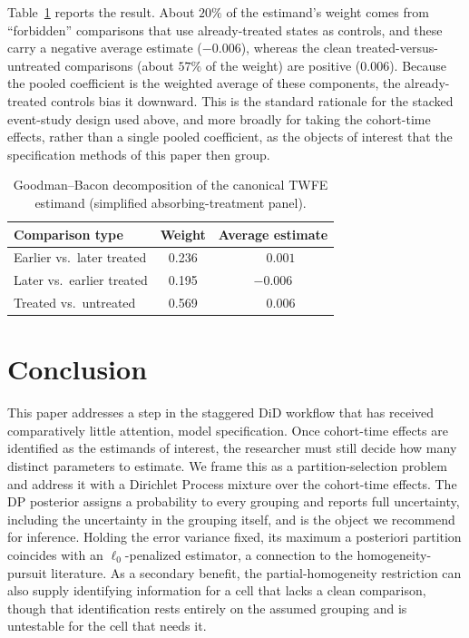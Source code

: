 \documentclass[margin=5in, 12pt]{article}
\newcommand{\1}{\mathbbm{1}}
\begin{document}
Table~\ref{tab:bacon_decomp} reports the result. About $20\%$ of the estimand's weight comes from ``forbidden'' comparisons that use already-treated states as controls, and these carry a negative average estimate ($-0.006$), whereas the clean treated-versus-untreated comparisons (about $57\%$ of the weight) are positive ($0.006$). Because the pooled coefficient is the weighted average of these components, the already-treated controls bias it downward. This is the standard rationale for the stacked event-study design used above, and more broadly for taking the cohort-time effects, rather than a single pooled coefficient, as the objects of interest that the specification methods of this paper then group.

\begin{table}[H]
    \centering
    \caption{Goodman--Bacon decomposition of the canonical TWFE estimand (simplified absorbing-treatment panel).}
    \label{tab:bacon_decomp}
    \begin{tabular}{lcc}
        \toprule
        Comparison type & Weight & Average estimate \\
        \midrule
        Earlier vs.\ later treated & 0.236 & $\phantom{-}0.001$ \\
        Later vs.\ earlier treated & 0.195 & $-0.006$ \\
        Treated vs.\ untreated     & 0.569 & $\phantom{-}0.006$ \\
        \bottomrule
    \end{tabular}
\end{table}

\section{Conclusion}
\label{sec:conc}

This paper addresses a step in the staggered DiD workflow that has received
comparatively little attention, model specification. Once cohort-time effects are
identified as the estimands of interest, the researcher must still decide how many
distinct parameters to estimate. We frame this as a partition-selection problem
and address it with a Dirichlet Process mixture over the cohort-time effects. The
DP posterior assigns a probability to every grouping and reports full uncertainty,
including the uncertainty in the grouping itself, and is the object we recommend
for inference. Holding the error variance fixed, its maximum a posteriori
partition coincides with an $\ell_0$-penalized estimator, a connection to
the homogeneity-pursuit literature. As a secondary benefit, the
partial-homogeneity restriction can also supply identifying information for a cell
that lacks a clean comparison, though that identification rests entirely on the
assumed grouping and is untestable for the cell that needs it.
\end{document}
